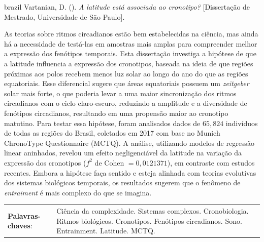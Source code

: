 \documentclass[
12pt,
openright,
oneside,
a4paper,
chapter=TITLE,
section=TITLE,
french,
spanish,
brazil,
english
]{abntex2}
\newcommand{\resumoestrangeironame}{Resumo}
\renewcommand{\resumoname}{Abstract}
\renewcommand{\resumoestrangeironame}{Resumo}
\renewcommand{\resumoname}{Resumo}
\renewcommand{\resumoestrangeironame}{Abstract}
\renewcommand{\resumoname}{Resumen}
\renewcommand{\resumoestrangeironame}{Resumo}
\renewcommand{\resumoname}{Résumé}
\renewcommand{\resumoestrangeironame}{Resumo}
\newenvironment{resumoenv}[1][\resumoname]{
  \pretextualchapter{#1}
  \begingroup
  \setlength{\parindent}{0cm}
  \setlength{\parskip}{\smallskipamount} %
  \AtBeginEnvironment{tabular}{\normalsize}
  \renewcommand{\arraystretch}{1}
  \setlength{\aboverulesep}{0ex}
  \setlength{\belowrulesep}{0ex}
  \setlength{\arrayrulewidth}{0pt}
  \setlength{\tabcolsep}{0cm}
  \vspace{-\smallskipamount} %
  \begin{SingleSpace}
}{
  \end{SingleSpace}
  \cleardoublepage
  \endgroup
}
\renewcommand{\arraystretch}{1.5}
\begin{document}

\begin{resumoenv}[\resumoestrangeironame]
\begin{otherlanguage*}{brazil}
Vartanian, D. ({\imprimirdata}). \textit{A latitude está associada ao cronotipo?} [Dissertação de Mestrado, Universidade de São Paulo].


As teorias sobre ritmos circadianos estão bem estabelecidas na ciência,
mas ainda há a necessidade de testá-las em amostras mais amplas para
compreender melhor a expressão dos fenótipos temporais. Esta dissertação
investiga a hipótese de que a latitude influencia a expressão dos
cronotipos, baseada na ideia de que regiões próximas aos polos recebem
menos luz solar ao longo do ano do que as regiões equatoriais. Esse
diferencial sugere que áreas equatoriais possuem um \emph{zeitgeber}
solar mais forte, o que poderia levar a uma maior sincronização dos
ritmos circadianos com o ciclo claro-escuro, reduzindo a amplitude e a
diversidade de fenótipos circadianos, resultando em uma propensão maior
ao cronotipo matutino. Para testar essa hipótese, foram analisados dados
de \(65,824\) indivíduos de todas as regiões do Brasil, coletados em
2017 com base no Munich ChronoType Questionnaire (MCTQ). A análise,
utilizando modelos de regressão linear aninhados, revelou um efeito
negligenciável da latitude na variação da expressão dos cronotipos
(\(f^2\) de Cohen \(= 0,0121371\)), em contraste com estudos recentes.
Embora a hipótese faça sentido e esteja alinhada com teorias evolutivas
dos sistemas biológicos temporais, os resultados sugerem que o fenômeno
de \emph{entraiment} é mais complexo do que se imagina.


\begin{tabular}{p{3.6cm} p{12.3cm}}
  \textbf{Palavras-chaves}: &  Ciência da complexidade. Sistemas complexos. Cronobiologia. Ritmos biológicos. Cronotipos. Fenótipos circadianos. Sono. Entrainment. Latitude. MCTQ.
\end{tabular}
\end{otherlanguage*}
\end{resumoenv}
\end{document}
